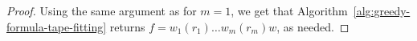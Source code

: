 \begin{proof}
    Using the same argument as for $m=1$, we get that Algorithm~\ref{alg:greedy-formula-tape-fitting} returns $f = w_1 (r_1) \dots w_m (r_m) w$, as needed.




\end{proof}





